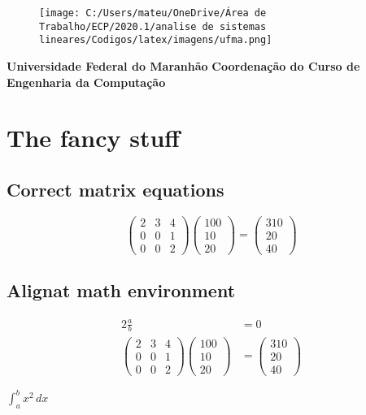 \documentclass[a4paper,12pt,twoside]{article}%
\begin{document}
%
\normalsize%


\begin{figure}[h!]%
\centering%
\texttt{[image: C:/Users/mateu/OneDrive/Área de Trabalho/ECP/2020.1/analise de sistemas lineares/Codigos/latex/imagens/ufma.png]}%
\end{figure}

%
\begin{center}%
{\large \rm \textbf {Universidade Federal do Maranhão} \linebreak}%
{\large \rm \textbf {Coordenação do Curso de Engenharia da Computação} \linebreak}%
\end{center}%
\section{The fancy stuff}%
\label{sec:Thefancystuff}%
\subsection{Correct matrix equations}%
\label{subsec:Correctmatrixequations}%
\[%
\begin{pmatrix}%
2&3&4\\%
0&0&1\\%
0&0&2%
\end{pmatrix} \begin{pmatrix}%
100\\%
10\\%
20%
\end{pmatrix} = \begin{pmatrix}%
310\\%
20\\%
40%
\end{pmatrix}%
\]

%
\subsection{Alignat math environment}%
\label{subsec:Alignatmathenvironment}%
\begin{alignat*}{2}%
\frac{a}{b} &= 0 \\%
\begin{pmatrix}%
2&3&4\\%
0&0&1\\%
0&0&2%
\end{pmatrix}%
\begin{pmatrix}%
100\\%
10\\%
20%
\end{pmatrix}%
&=%
\begin{pmatrix}%
310\\%
20\\%
40%
\end{pmatrix}%
\end{alignat*}

%
$\int_{a}^{b} x^2 \,dx$%
\end{document}
